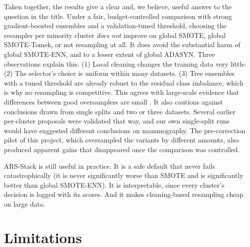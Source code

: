 \documentclass[11pt,a4paper]{article}
\begin{document}
Taken together, the results give a clear and, we believe, useful answer to the question in the title. Under a fair, budget-controlled comparison with strong gradient-boosted ensembles and a validation-tuned threshold, choosing the resampler per minority cluster \emph{does not} improve on global SMOTE, global SMOTE-Tomek, or not resampling at all. It does avoid the substantial harm of global SMOTE-ENN, and to a lesser extent of global ADASYN. Three observations explain this. (1) Local cleaning changes the training data very little. (2) The selector's choice is uniform within many datasets. (3) Tree ensembles with a tuned threshold are already robust to the residual class imbalance, which is why no resampling is competitive. This agrees with large-scale evidence that differences between good oversamplers are small \cite{kovacs2019empirical}. It also cautions against conclusions drawn from single splits and two or three datasets. Several earlier per-cluster proposals were validated that way, and our own single-split runs would have suggested different conclusions on mammography. The pre-correction pilot of this project, which oversampled the variants by different amounts, also produced apparent gains that disappeared once the comparison was controlled.

ARS-Stack is still useful in practice. It is a safe default that never fails catastrophically (it is never significantly worse than SMOTE and is significantly better than global SMOTE-ENN). It is interpretable, since every cluster's decision is logged with its scores. And it makes cleaning-based resampling cheap on large data.

\section{Limitations}\label{sec:limitations}
\end{document}
